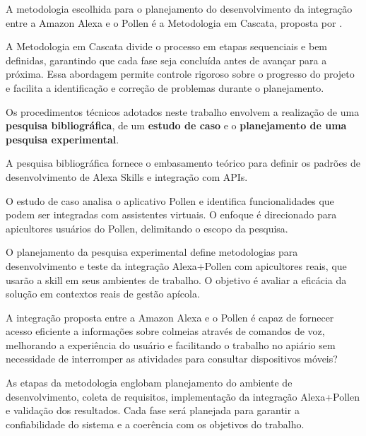 \label{cap:procedimentos-metodologicos-tecnicos}

\label{sec:caracterizacao-metodologia-pesquisa}
    
A metodologia escolhida para o planejamento do desenvolvimento da integração entre a Amazon Alexa e o Pollen é a Metodologia em Cascata, proposta por \textcite{sommerville2011}.

A Metodologia em Cascata divide o processo em etapas sequenciais e bem definidas, garantindo que cada fase seja concluída antes de avançar para a próxima. Essa abordagem permite controle rigoroso sobre o progresso do projeto e facilita a identificação e correção de problemas durante o planejamento.

Os procedimentos técnicos adotados neste trabalho envolvem a realização de uma \textbf{pesquisa bibliográfica}, de um \textbf{estudo de caso} e o \textbf{planejamento de uma pesquisa experimental}.

A pesquisa bibliográfica fornece o embasamento teórico para definir os padrões de desenvolvimento de Alexa Skills e integração com APIs.

O estudo de caso analisa o aplicativo Pollen e identifica funcionalidades que podem ser integradas com assistentes virtuais. O enfoque é direcionado para apicultores usuários do Pollen, delimitando o escopo da pesquisa.

O planejamento da pesquisa experimental define metodologias para desenvolvimento e teste da integração Alexa+Pollen com apicultores reais, que usarão a skill em seus ambientes de trabalho. O objetivo é avaliar a eficácia da solução em contextos reais de gestão apícola.
    
    
\label{sec:questoes-pesquisa}

A integração proposta entre a Amazon Alexa e o Pollen é capaz de fornecer acesso eficiente a informações sobre colmeias através de comandos de voz, melhorando a experiência do usuário e facilitando o trabalho no apiário sem necessidade de interromper as atividades para consultar dispositivos móveis?

\label{sec:aplicacao-metodologia}

As etapas da metodologia englobam planejamento do ambiente de desenvolvimento, coleta de requisitos, implementação da integração Alexa+Pollen e validação dos resultados. Cada fase será planejada para garantir a confiabilidade do sistema e a coerência com os objetivos do trabalho.

